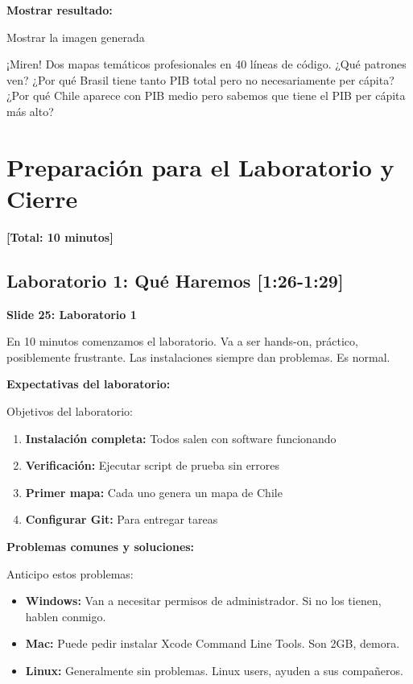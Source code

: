 \documentclass[11pt,a4paper]{article}
\newcommand{\tiempo}[1]{\textcolor{timecolor}{\faIcon{clock} \textbf{[#1]}}}
\newcommand{\decir}[1]{\begin{tcolorbox}[colback=blue!5,colframe=usachblue,title={\faIcon{microphone} DECIR}]#1\end{tcolorbox}}
\newcommand{\hacer}[1]{\begin{tcolorbox}[colback=green!5,colframe=green!50!black,title={\faIcon{hand-point-right} HACER}]#1\end{tcolorbox}}
\begin{document}
\textbf{Mostrar resultado:}

\hacer{Mostrar la imagen generada}

\decir{¡Miren! Dos mapas temáticos profesionales en 40 líneas de código. ¿Qué patrones ven? ¿Por qué Brasil tiene tanto PIB total pero no necesariamente per cápita? ¿Por qué Chile aparece con PIB medio pero sabemos que tiene el PIB per cápita más alto?}

\newpage

\section{Preparación para el Laboratorio y Cierre}

\tiempo{Total: 10 minutos}

\subsection{Laboratorio 1: Qué Haremos \tiempo{1:26-1:29}}

\textbf{Slide 25: Laboratorio 1}

\decir{En 10 minutos comenzamos el laboratorio. Va a ser hands-on, práctico, posiblemente frustrante. Las instalaciones siempre dan problemas. Es normal.}

\textbf{Expectativas del laboratorio:}

\decir{
Objetivos del laboratorio:
\begin{enumerate}
    \item \textbf{Instalación completa:} Todos salen con software funcionando
    \item \textbf{Verificación:} Ejecutar script de prueba sin errores
    \item \textbf{Primer mapa:} Cada uno genera un mapa de Chile
    \item \textbf{Configurar Git:} Para entregar tareas
\end{enumerate}
}

\textbf{Problemas comunes y soluciones:}

\decir{
Anticipo estos problemas:
\begin{itemize}
    \item \textbf{Windows:} Van a necesitar permisos de administrador. Si no los tienen, hablen conmigo.
    \item \textbf{Mac:} Puede pedir instalar Xcode Command Line Tools. Son 2GB, demora.
    \item \textbf{Linux:} Generalmente sin problemas. Linux users, ayuden a sus compañeros.
\end{itemize}
}
\end{document}
